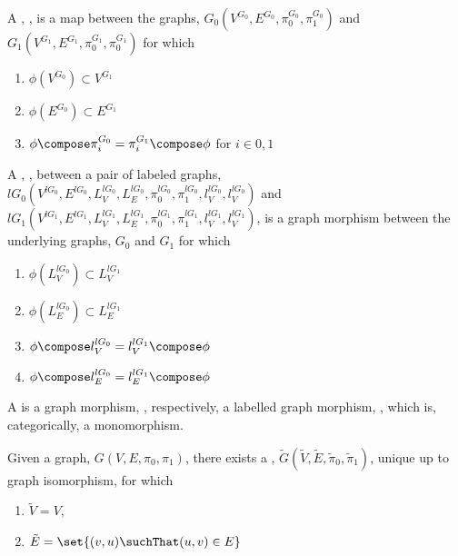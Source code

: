 \documentclass[a4paper]{amsart}
\begin{document}
\begin{definition}
A , , is a map between the graphs,
$G_0(V^{G_0}, E^{G_0}, \pi^{G_0}_0, \pi^{G_0}_1)$ and $G_1(V^{G_1}, E^{G_1}, \pi^{G_1}_0,
\pi^{G_1}_0)$ for which
\begin{enumerate}
\item $\phi(V^{G_0}) \subset V^{G_1}$
\item $\phi(E^{G_0}) \subset E^{G_1}$
\item $\phi \compose \pi^{G_0}_i = \pi^{G_1}_i \compose \phi$ for $i \in {0, 1}$
\end{enumerate}

A , , between a pair of labeled
graphs, $lG_0(V^{lG_0}, E^{lG_0}, L^{lG_0}_V, L^{lG_0}_E, \pi^{lG_0}_0, \pi^{lG_0}_1,
l^{lG_0}_V, l^{lG_0}_V)$ and $lG_1(V^{lG_1}, E^{lG_1}, L^{lG_1}_V, L^{lG_1}_E,
\pi^{lG_1}_0, \pi^{lG_1}_1, l^{lG_1}_V, l^{lG_1}_V)$, is a graph morphism between the
underlying graphs, $G_0$ and $G_1$ for which
\begin{enumerate}
\item $\phi(L^{lG_0}_V) \subset L^{lG_1}_V$
\item $\phi(L^{lG_0}_E) \subset L^{lG_1}_E$
\item $\phi \compose l^{lG_0}_V = l^{lG_1}_V \compose \phi$
\item $\phi \compose l^{lG_0}_E = l^{lG_1}_E \compose \phi$
\end{enumerate}
\end{definition}

\begin{definition} 
A  is a graph morphism, , respectively, a
labelled graph morphism, , which is, categorically, a monomorphism.
\end{definition}

\begin{lemma}
Given a graph, $G(V, E, \pi_0, \pi_1)$, there exists a ,
$\tilde{G}(\tilde{V}, \tilde{E}, \tilde{\pi}_0, \tilde{\pi}_1)$, unique up to graph 
isomorphism, for which
\begin{enumerate}
\item $\tilde{V} = V$,
\item $\tilde{E} = \set{(v, u) \suchThat (u, v) \in E}$
\end{enumerate}
\end{lemma}
\end{document}
